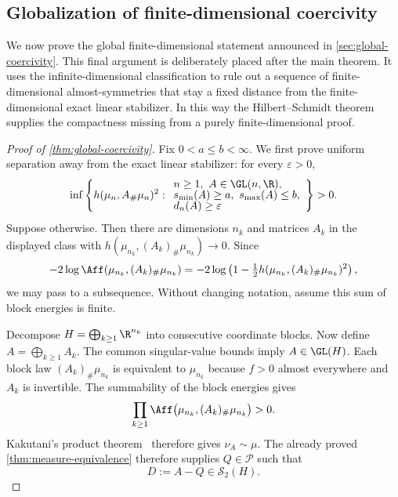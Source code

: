 \subsection{Globalization of finite-dimensional coercivity}
\label{sec:globalization-proof}

We now prove the global finite-dimensional statement announced in
\cref{sec:global-coercivity}.
This final argument is deliberately placed after the main theorem.
It uses the infinite-dimensional classification to rule out a sequence of
finite-dimensional almost-symmetries that stay a fixed distance from the
finite-dimensional exact linear stabilizer.
In this way the Hilbert--Schmidt theorem supplies the compactness missing
from a purely finite-dimensional proof.

\begin{proof}[Proof of \cref{thm:global-coercivity}]
Fix \(0<a\le b<\infty\).  We first prove uniform separation away from
the exact linear stabilizer: for every \(\varepsilon>0\),
\begin{equation}
 \inf\left\{
 h(\mu_n,A_\#\mu_n)^2:
 \begin{array}{l}
 n\ge1,\ A\in\GL(n,\R),\\[-2pt]
 s_{\min}(A)\ge a,\ s_{\max}(A)\le b,\\[-2pt]
 d_n(A)\ge\varepsilon
 \end{array}\right\}>0.
 \label{eq:uniform-separation}
\end{equation}
Suppose otherwise.
Then there are dimensions \(n_k\) and matrices \(A_k\) in the displayed class
with
\(h(\mu_{n_k},(A_k)_\#\mu_{n_k})\to0\).  Since
\[
 -2\log\Aff(\mu_{n_k},(A_k)_\#\mu_{n_k})
 =-2\log\left(1-\tfrac12
 h(\mu_{n_k},(A_k)_\#\mu_{n_k})^2\right),
 \]
we may pass to a subsequence.
Without changing notation, assume this sum of block energies is finite.

Decompose \(H=\bigoplus_{k\ge1}\R^{n_k}\) into consecutive
coordinate blocks.
Now define
\(A=\bigoplus_{k\ge1}A_k\).  The common singular-value bounds imply
\(A\in\GL(H)\).  Each block law $(A_k)_\#\mu_{n_k}$ is
equivalent to $\mu_{n_k}$ because $f>0$ almost everywhere and $A_k$ is
invertible.  The summability of the block energies gives
\[
 \prod_{k\ge1}\Aff\bigl(\mu_{n_k},(A_k)_\#\mu_{n_k}\bigr)>0.
\]
Kakutani's product theorem~\cite{kakutani1948equivalence} therefore
gives \(\nu_A\sim\mu\).  The already proved
\cref{thm:measure-equivalence} therefore supplies \(Q\in\mathcal P\) such that
\begin{equation}
 D:=A-Q\in\mathcal S_2(H).
 \label{eq:globalization-D}
\end{equation}


\end{proof}
